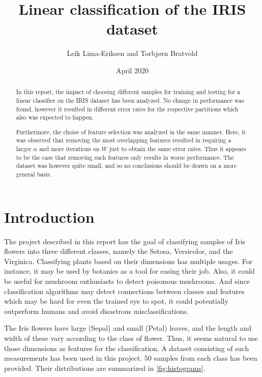 \documentclass{article}
\begin{document}
\title{Linear classification of the IRIS dataset}
\author{Leik Lima-Eriksen and Torbjørn Bratvold}
\date{April 2020}

\maketitle
\begin{abstract}
    In this report, the impact of choosing different samples for training and
    testing for a linear classifier on the IRIS dataset has been analyzed. No change in
    performance was found, however it resulted in different error rates for the respective
    partitions which also was expected to happen.

    Furthermore, the choise of feature selection was analyzed in the same manner.
    Here, it was observed that removing the most overlapping features resulted in requiring
    a larger $\alpha$ and more iterations on $W$ just to obtain the same error rates. Thus
    it appears to be the case that removing such features only results in worse performance.
    The dataset was however quite small, and so no conclusions should be drawn on a more
    general basis.
 \end{abstract}
\newpage

\tableofcontents
\newpage

\section{Introduction}\label{sec:introduction}
The project described in this report has the goal of classifying samples of Iris flowers into
three different classes, namely the Setosa, Versicolor, and the Virginica. Classifying plants
based on their dimensions has multiple usages. For instance, it may be used by botanics as a tool
for easing their job. Also, it could be useful for mushroom enthusiasts to detect poisonous
mushrooms. And since classification algorithms may detect connections between classes and features
which may be hard for even the trained eye to spot, it could potentially outperform humans and
avoid disastrous misclassifications.

The Iris flowers have large (Sepal) and small (Petal) leaves, and the length and width of these
vary according to the class of flower. Thus, it seems natural to use those dimensions as features
for the classification. A dataset consisting of such measurements has been used in this project. 50
samples from each class has been provided. Their distributions are summarized in \autoref{fig:histograms}.
\end{document}
